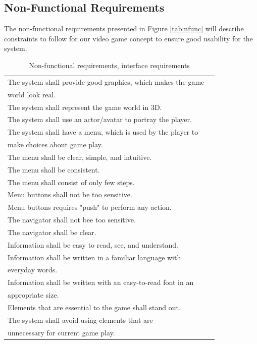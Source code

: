 \subsection{Non-Functional Requirements}
The non-functional requirements presented in Figure \ref{tab:nfunc} will describe constraints to follow for our video game concept to ensure good usability for the system.

\begin{table} [H]
\label{tab:nfunc}
\centering
    \begin{tabular}{|l|l|}
 
       \hline
       The system shall provide good graphics, which makes the game \\ world look real. \\ \hline
	   The system shall represent the game world in 3D.\\ \hline
	   The system shall use an actor/avatar to portray the player.\\ \hline
	   The system shall have a menu, which is used by the player to \\ make choices about game play.\\ \hline
	   The menu shall be clear, simple, and intuitive.\\ \hline
	   The menu shall be consistent. \\ \hline
	   The menu shall consist of only few steps.\\ \hline
	   Menu buttons shall not be too sensitive.\\ \hline
	   Menu buttons requires "push" to perform any action.\\ \hline
	   The navigator shall not bee too sensitive. \\ \hline
	   The navigator shall be clear.\\ \hline
	   Information shall be easy to read, see, and understand.\\ \hline
	   Information shall be written in a familiar language with \\ everyday words.  \\ \hline
	   Information shall be written with an easy-to-read font in an \\ appropriate size. \\ \hline
	   Elements that are essential to the game shall stand out.\\ \hline
	   The system shall avoid using elements that are \\ unnecessary for current game play.\\ \hline
    \end{tabular}
    \caption[Non-functional requirements]{Non-functional requirements, interface requirements}
    \label{tab:agenda}
\end{table} 

